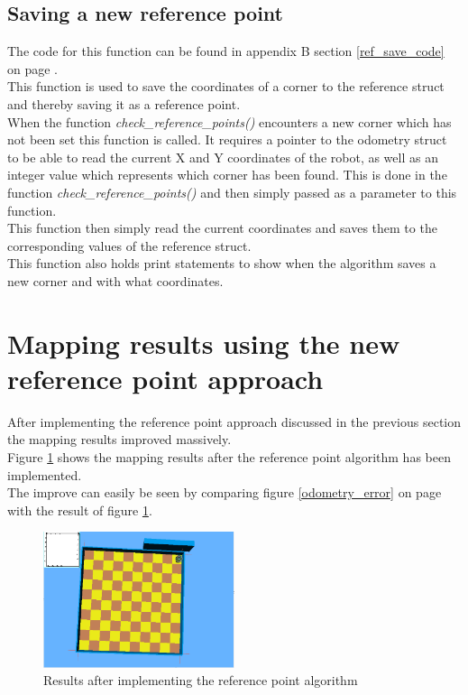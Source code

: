 \subsection{Saving a new reference point}
\label{ref_save_description}
The code for this function can be found in appendix B section \ref{ref_save_code} on page \pageref{ref_save_code}.\\
This function is used to save the coordinates of a corner to the reference struct and thereby saving it as a reference point. \\
When the function \textit{check\_reference\_points()} encounters a new corner which has not been set this function is called. It requires a pointer to the odometry struct to be able to read the current X and Y coordinates of the robot, as well as an integer value which represents which corner has been found. This is done in the function \textit{check\_reference\_points()} and then simply passed as a parameter to this function. \\
This function then simply read the current coordinates and saves them to the corresponding values of the reference struct.\\
This function also holds print statements to show when the algorithm saves a new corner and with what coordinates.

\section{Mapping results using the new reference point approach}
After implementing the reference point approach discussed in the previous section the mapping results improved massively.\\
Figure \ref{ref_result} shows the mapping results after the reference point algorithm has been implemented. \\
The improve can easily be seen by comparing figure \ref{odometry_error} on page \pageref{odometry_error} with the result of figure \ref{ref_result}.

\begin{figure}[h]
\centering
\includegraphics[width = 0.5\textwidth]{../../figures/map_results/result_room1_empty.png} 
\caption{Results after implementing the reference point algorithm}
\label{ref_result}
\end{figure}






 




